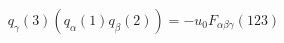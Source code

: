 \begin{equation}                      
q_{\gamma}(3) (q_{\alpha}(1) q_{\beta}(2))  = -u_{0}                       
F_{\alpha \beta \gamma}(123)                      
\end{equation} 
